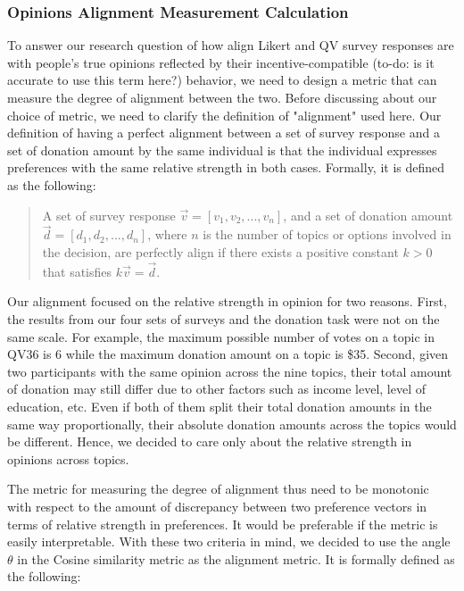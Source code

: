\subsubsection{Opinions Alignment Measurement Calculation}

To answer our research question of how align Likert and QV survey responses are with people's true opinions reflected by their incentive-compatible (to-do: is it accurate to use this term here?) behavior, we need to design a metric that can measure the degree of alignment between the two. Before discussing about our choice of metric, we need to clarify the definition of "alignment" used here. Our definition of having a perfect alignment between a set of survey response and a set of donation amount by the same individual is that the individual expresses preferences with the same relative strength in both cases. Formally, it is defined as the following:\par

\begin{quote}
    A set of survey response $\vec{v} = [v_1, v_2, ..., v_n]$, and a set of donation amount $\vec{d} = [d_1, d_2, ..., d_n]$, where $n$ is the number of topics or options involved in the decision, are perfectly align if there exists a positive constant $k>0$ that satisfies $k\vec{v} = \vec{d}$.
\end{quote}

Our alignment focused on the relative strength in opinion for two reasons. First, the results from our four sets of surveys and the donation task were not on the same scale. For example, the maximum possible number of votes on a topic in QV36 is 6 while the maximum donation amount on a topic is \$35. Second, given two participants with the same opinion across the nine topics, their total amount of donation may still differ due to other factors such as income level, level of education, etc. Even if both of them split their total donation amounts in the same way proportionally, their absolute donation amounts across the topics would be different. Hence, we decided to care only about the relative strength in opinions across topics.

The metric for measuring the degree of alignment thus need to be monotonic with respect to the amount of discrepancy between two preference vectors in terms of relative strength in preferences. It would be preferable if the metric is easily interpretable. With these two criteria in mind, we decided to use the angle $\theta$ in the Cosine similarity metric as the alignment metric. It is formally defined as the following: \par

